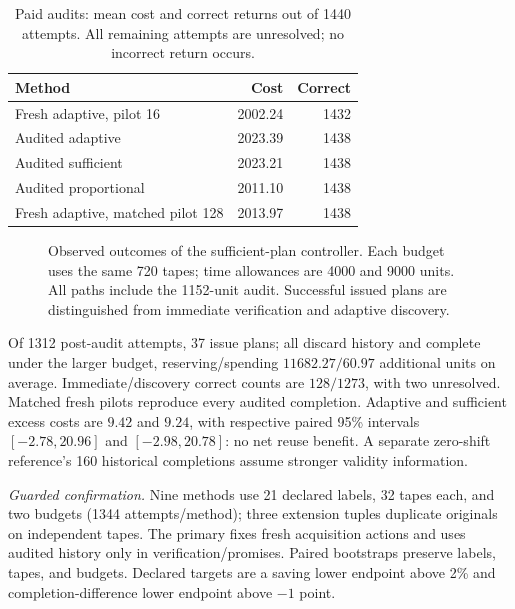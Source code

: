 \begin{table}[t]
\centering\small
\caption{Paid audits: mean cost and correct returns out of 1440 attempts. All remaining attempts are unresolved; no incorrect return occurs.}
\label{tab:validity-study-overall}
\begin{tabular}{@{}lrr@{}}
\toprule
Method &Cost&Correct\\
\midrule
Fresh adaptive, pilot 16&2002.24&1432\\
Audited adaptive&2023.39&1438\\
Audited sufficient&2023.21&1438\\
Audited proportional&2011.10&1438\\
Fresh adaptive, matched pilot 128&2013.97&1438\\
\bottomrule
\end{tabular}
\end{table}
\begin{figure}[t]
\centering
\resizebox{\columnwidth}{!}{}
\caption{Observed outcomes of the sufficient-plan controller. Each budget
uses the same 720 tapes; time allowances are 4000 and 9000 units. All paths
include the 1152-unit audit. Successful issued plans are distinguished from
immediate verification and adaptive discovery.}
\label{fig:validity-outcomes}
\end{figure}
Of 1312 post-audit attempts, 37 issue plans; all discard history and complete under the larger budget, reserving/spending $11682.27/60.97$ additional units on average. Immediate/discovery correct counts are $128/1273$, with two unresolved. Matched fresh pilots reproduce every audited completion. Adaptive and sufficient excess costs are $9.42$ and $9.24$, with respective paired 95\% intervals $[-2.78,20.96]$ and $[-2.98,20.78]$: no net reuse benefit. A separate zero-shift reference's 160 historical completions assume stronger validity information.

\label{app:v37-study}
\emph{Guarded confirmation.} Nine methods use 21 declared labels, 32 tapes each, and two budgets (1344 attempts/method); three extension tuples duplicate originals on independent tapes. The primary fixes fresh acquisition actions and uses audited history only in verification/promises. Paired bootstraps preserve labels, tapes, and budgets. Declared targets are a saving lower endpoint above 2\% and completion-difference lower endpoint above $-1$ point.


